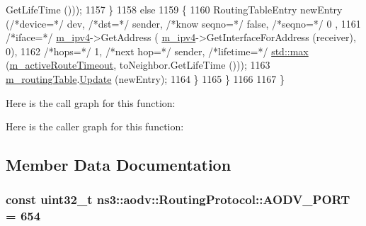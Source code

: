 \begin{DoxyCode}
      GetLifeTime ()));
1157         \}
1158       \textcolor{keywordflow}{else}
1159         \{
1160           RoutingTableEntry newEntry (\textcolor{comment}{/*device=*/} dev, \textcolor{comment}{/*dst=*/} sender, \textcolor{comment}{/*know seqno=*/} \textcolor{keyword}{false}, \textcolor{comment}{/*seqno=*/} 0
      ,
1161                                                   \textcolor{comment}{/*iface=*/} \hyperlink{classns3_1_1aodv_1_1RoutingProtocol_aee33006b1f9d8b24d4722037ff3fec98}{m\_ipv4}->GetAddress (
      \hyperlink{classns3_1_1aodv_1_1RoutingProtocol_aee33006b1f9d8b24d4722037ff3fec98}{m\_ipv4}->GetInterfaceForAddress (receiver), 0),
1162                                                   \textcolor{comment}{/*hops=*/} 1, \textcolor{comment}{/*next hop=*/} sender, \textcolor{comment}{/*lifetime=*/} 
      \hyperlink{80211b_8c_affe776513b24d84b39af8ab0930fef7f}{std::max} (\hyperlink{classns3_1_1aodv_1_1RoutingProtocol_a37ec921ef1c48e4d8e7072fe989613d2}{m\_activeRouteTimeout}, toNeighbor.GetLifeTime ()));
1163           \hyperlink{classns3_1_1aodv_1_1RoutingProtocol_a4e1003a34c8adc96db71096d88c98ae0}{m\_routingTable}.\hyperlink{classns3_1_1aodv_1_1RoutingTable_a39fb5335110164f4c1b97682a3812dc1}{Update} (newEntry);
1164         \}
1165     \}
1166 
1167 \}
\end{DoxyCode}


Here is the call graph for this function\+:




Here is the caller graph for this function\+:




\subsection{Member Data Documentation}
\subsubsection[{\texorpdfstring{A\+O\+D\+V\+\_\+\+P\+O\+RT}{AODV_PORT}}]{\setlength{\rightskip}{0pt plus 5cm}const uint32\+\_\+t ns3\+::aodv\+::\+Routing\+Protocol\+::\+A\+O\+D\+V\+\_\+\+P\+O\+RT = 654\hspace{0.3cm}{\ttfamily [static]}}\hypertarget{classns3_1_1aodv_1_1RoutingProtocol_ac4a3de99b49ad5f6efc9b71a700f7ec4}{}\label{classns3_1_1aodv_1_1RoutingProtocol_ac4a3de99b49ad5f6efc9b71a700f7ec4}


